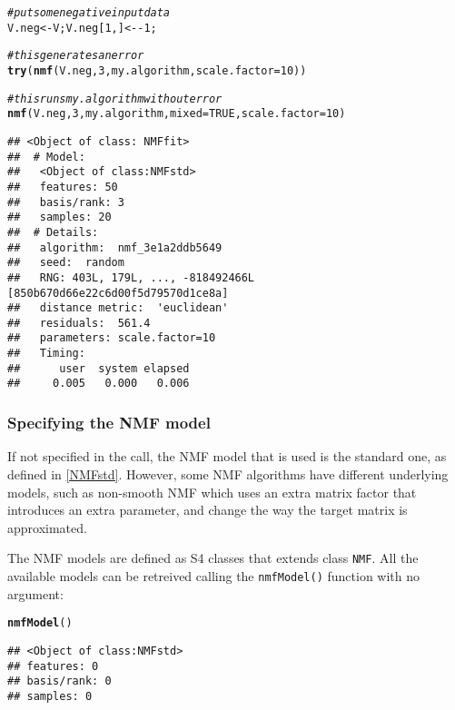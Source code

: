 \documentclass[a4paper]{article}\usepackage[]{graphicx}\usepackage[]{color}
\makeatletter
\newcommand{\hlnum}[1]{\textcolor[rgb]{0.686,0.059,0.569}{#1}}%
\newcommand{\hlcom}[1]{\textcolor[rgb]{0.678,0.584,0.686}{\textit{#1}}}%
\newcommand{\hlopt}[1]{\textcolor[rgb]{0,0,0}{#1}}%
\newcommand{\hlstd}[1]{\textcolor[rgb]{0.345,0.345,0.345}{#1}}%
\newcommand{\hlkwb}[1]{\textcolor[rgb]{0.69,0.353,0.396}{#1}}%
\newcommand{\hlkwc}[1]{\textcolor[rgb]{0.333,0.667,0.333}{#1}}%
\newcommand{\hlkwd}[1]{\textcolor[rgb]{0.737,0.353,0.396}{\textbf{#1}}}%
\newenvironment{kframe}{%
 \def\at@end@of@kframe{}%
 \ifinner\ifhmode%
  \def\at@end@of@kframe{\end{minipage}}%
  \begin{minipage}{\columnwidth}%
 \fi\fi%
 \def\FrameCommand##1{\hskip\@totalleftmargin \hskip-\fboxsep
 \colorbox{shadecolor}{##1}\hskip-\fboxsep
     \hskip-\linewidth \hskip-\@totalleftmargin \hskip\columnwidth}%
 \MakeFramed {\advance\hsize-\width
   \@totalleftmargin\z@ \linewidth\hsize
   \@setminipage}}%
 {\par\unskip\endMakeFramed%
 \at@end@of@kframe}
\newenvironment{knitrout}{}{} %
\let\code=\texttt
\renewcommand{\cite}[1]{\parencite{#1}}
\makeatother
\begin{document}
\begin{knitrout}
\color{fgcolor}\begin{kframe}
\begin{alltt}
\hlcom{# put some negative input data }
\hlstd{V.neg} \hlkwb{<-} \hlstd{V; V.neg[}\hlnum{1}\hlstd{,]} \hlkwb{<-} \hlopt{-}\hlnum{1}\hlstd{;}

\hlcom{# this generates an error}
\hlkwd{try}\hlstd{(} \hlkwd{nmf}\hlstd{(V.neg,} \hlnum{3}\hlstd{, my.algorithm,} \hlkwc{scale.factor}\hlstd{=}\hlnum{10}\hlstd{) )}
\end{alltt}


{\ttfamily\noindent\bfseries\color{errorcolor}{\#\# Error: NMF::nmf - Input matrix x contains some negative entries.}}\begin{alltt}
\hlcom{# this runs my.algorithm without error}
\hlkwd{nmf}\hlstd{(V.neg,} \hlnum{3}\hlstd{, my.algorithm,} \hlkwc{mixed}\hlstd{=}\hlnum{TRUE}\hlstd{,} \hlkwc{scale.factor}\hlstd{=}\hlnum{10}\hlstd{)}
\end{alltt}
\begin{verbatim}
## <Object of class: NMFfit>
##  # Model:
##   <Object of class:NMFstd>
##   features: 50 
##   basis/rank: 3 
##   samples: 20 
##  # Details:
##   algorithm:  nmf_3e1a2ddb5649 
##   seed:  random 
##   RNG: 403L, 179L, ..., -818492466L [850b670d66e22c6d00f5d79570d1ce8a]
##   distance metric:  'euclidean' 
##   residuals:  561.4 
##   parameters: scale.factor=10 
##   Timing:
##      user  system elapsed 
##     0.005   0.000   0.006
\end{verbatim}
\end{kframe}
\end{knitrout}

\subsubsection{Specifying the NMF model}
If not specified in the call, the NMF model that is used is the standard one, as defined in \cref{NMFstd}. 
However, some NMF algorithms have different underlying models, such as non-smooth NMF \cite{Pascual-Montano2006} which uses an extra matrix factor that introduces an extra parameter, and change the way the target matrix is approximated.

The NMF models are defined as S4 classes that extends class \code{NMF}. All the available models can be retreived calling the \code{nmfModel()} function with no 
argument:

\begin{knitrout}
\color{fgcolor}\begin{kframe}
\begin{alltt}
\hlkwd{nmfModel}\hlstd{()}
\end{alltt}
\begin{verbatim}
## <Object of class:NMFstd>
## features: 0 
## basis/rank: 0 
## samples: 0
\end{verbatim}
\end{kframe}
\end{knitrout}
 
\end{document}

